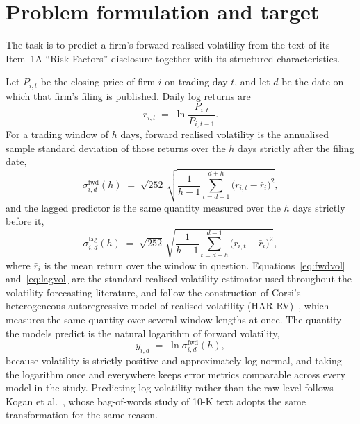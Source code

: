 \documentclass[logo,msc,ai]{infthesis}        %
\begin{document}
\section{Problem formulation and target}
\label{sec:target}
The task is to predict a firm's forward realised volatility from the text of its Item~1A ``Risk Factors'' disclosure together with its structured characteristics.

Let $P_{i,t}$ be the closing price of firm $i$ on trading day $t$, and let $d$ be the date on which that firm's filing is published. Daily log returns are
\begin{equation}
r_{i,t} \;=\; \ln \frac{P_{i,t}}{P_{i,t-1}} .
\label{eq:logret}
\end{equation}
For a trading window of $h$ days, forward realised volatility is the annualised sample standard deviation of those returns over the $h$ days strictly after the filing date,
\begin{equation}
\sigma^{\mathrm{fwd}}_{i,d}(h) \;=\; \sqrt{252} \, \sqrt{ \frac{1}{h-1} \sum_{t=d+1}^{d+h} \bigl( r_{i,t} - \bar{r}_{i} \bigr)^{2} } ,
\label{eq:fwdvol}
\end{equation}
and the lagged predictor is the same quantity measured over the $h$ days strictly before it,
\begin{equation}
\sigma^{\mathrm{lag}}_{i,d}(h) \;=\; \sqrt{252} \, \sqrt{ \frac{1}{h-1} \sum_{t=d-h}^{d-1} \bigl( r_{i,t} - \bar{r}_{i} \bigr)^{2} } ,
\label{eq:lagvol}
\end{equation}
where $\bar{r}_{i}$ is the mean return over the window in question. Equations~\ref{eq:fwdvol} and~\ref{eq:lagvol} are the standard realised-volatility estimator used throughout the volatility-forecasting literature, and follow the construction of Corsi's heterogeneous autoregressive model of realised volatility (HAR-RV)~\cite{corsi2009simple}, which measures the same quantity over several window lengths at once. The quantity the models predict is the natural logarithm of forward volatility,
\begin{equation}
y_{i,d} \;=\; \ln \sigma^{\mathrm{fwd}}_{i,d}(h) ,
\label{eq:target}
\end{equation}
because volatility is strictly positive and approximately log-normal, and taking the logarithm once and everywhere keeps error metrics comparable across every model in the study. Predicting log volatility rather than the raw level follows Kogan et al.~\cite{kogan2009predicting}, whose bag-of-words study of 10-K text adopts the same transformation for the same reason.
\end{document}
